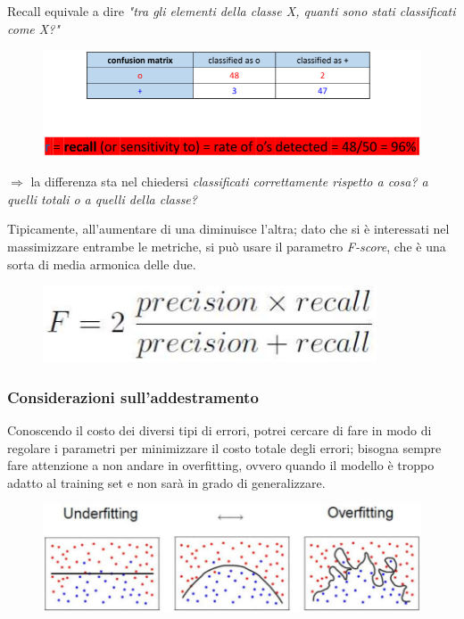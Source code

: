 \documentclass{report}
\begin{document}
\noindent Recall equivale a dire \textit{"tra gli elementi della classe X, quanti sono stati classificati come X?"}

\begin{figure}[H]
    \centering
    \includegraphics[width=0.9\linewidth]{images/recall.png}
\end{figure}

\noindent $\Rightarrow$ la differenza sta nel chiedersi \textit{classificati correttamente rispetto a cosa? a quelli totali o a quelli della classe?}

\noindent Tipicamente, all'aumentare di una diminuisce l'altra; dato che si è interessati nel massimizzare entrambe le metriche, si può usare 
il parametro \textit{F-score}, che è una sorta di media armonica delle due.

\begin{figure}[H]
    \centering
    \includegraphics[width=0.4\linewidth]{images/f-score.png}
\end{figure}

\subsubsection{Considerazioni sull'addestramento}

Conoscendo il costo dei diversi tipi di errori, potrei cercare di fare in modo di regolare i parametri per minimizzare il costo totale 
degli errori; bisogna sempre fare attenzione a non andare in overfitting, ovvero quando il modello è troppo adatto al training set e 
non sarà in grado di generalizzare.

\begin{figure}[H]
    \centering
    \includegraphics[width=1\linewidth]{images/overfitting.png}
\end{figure}
\end{document}
